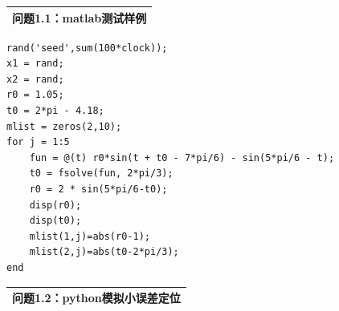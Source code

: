 \documentclass{my_paper}
\begin{document}
\begin{table}[htbp]
    \centering
    \begin{tabular}{|p{14.0cm}|}
    \hline
    \textbf{问题1.1：matlab测试样例} \\ %
    \hline
    \end{tabular}
\end{table}

\begin{lstlisting}
rand('seed',sum(100*clock));
x1 = rand;
x2 = rand;
r0 = 1.05;
t0 = 2*pi - 4.18;
mlist = zeros(2,10);
for j = 1:5
    fun = @(t) r0*sin(t + t0 - 7*pi/6) - sin(5*pi/6 - t);
    t0 = fsolve(fun, 2*pi/3);
    r0 = 2 * sin(5*pi/6-t0);
    disp(r0);
    disp(t0);
    mlist(1,j)=abs(r0-1);
    mlist(2,j)=abs(t0-2*pi/3);
end
\end{lstlisting}
\begin{table}[htbp]
    \centering
    \begin{tabular}{|p{14.0cm}|}
    \hline
    \textbf{问题1.2：python模拟小误差定位} \\ %
    \hline
    \end{tabular}
\end{table}
\end{document}
